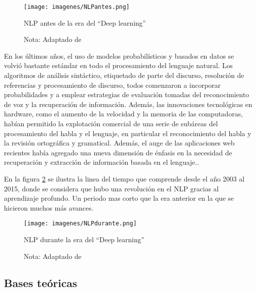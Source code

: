 \documentclass[12pt]{article}
\begin{document}
			\begin{figure}[H]
				\texttt{[image: imagenes/NLPantes.png]}
				\centering
				\caption{NLP antes de la era del ``Deep learning''}
				\caption*{\small Nota: Adaptado de  \cite{Louis2020}}
				\label{fig:NLPantes}
			\end{figure}
			
			
			En los últimos años, el uso de modelos probabilísticos y basados en datos se volvió bastante estándar en todo el procesamiento del lenguaje natural. Los algoritmos de análisis sintáctico, etiquetado de parte del discurso, resolución de referencias y procesamiento de discurso, todos comenzaron a incorporar probabilidades y a emplear estrategias de evaluación tomadas del reconocimiento de voz y la recuperación de información. Además, las innovaciones tecnológicas en hardware, como el aumento de la velocidad y la memoria de las computadoras, habían permitido la explotación comercial de una serie de subáreas del procesamiento del habla y el lenguaje, en particular el reconocimiento del habla y la revisión ortográfica y gramatical. Además, el auge de las aplicaciones web recientes había agregado una nueva dimensión de énfasis en la necesidad de recuperación y extracción de información basada en el lenguaje.\cite{Kumar2011}.
			
			En la figura \ref{fig:NLPdurante} se ilustra la linea del tiempo que comprende desde el año 2003 al 2015, donde se considera que hubo una revolución en el NLP gracias al aprendizaje profundo. Un periodo mas corto que la era anterior en la que se hicieron muchos más avances. 
			
			\begin{figure}[H]
				\texttt{[image: imagenes/NLPdurante.png]}
				\centering
				\caption{NLP durante la era del ``Deep learning''}
				\caption*{\small Nota: Adaptado de  \cite{Louis2020a}}
				\label{fig:NLPdurante}
			\end{figure}
	
		\subsection{Bases teóricas}
\end{document}
